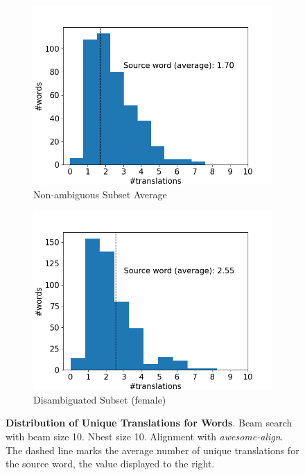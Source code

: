 \begin{figure}[!htb]
\begin{subfigure}{0.49\textwidth}
         \label{fig:alignment_translation_male}
     \end{subfigure}
     \begin{subfigure}{0.49\textwidth}
         \centering
         \includegraphics[width=\textwidth]{figures/alignment/align_10/word_translations_average.png}
         \caption{Non-ambiguous Subset Average}
         \label{fig:alignment_translation_common}
     \end{subfigure}
     \hfill
     \begin{subfigure}{0.49\textwidth}
         \centering
         \includegraphics[width=\textwidth]{figures/alignment/align_10/word_translations_female.png}
         \caption{Disambiguated Subset (female)}
         \label{fig:alignment_translation_female}
     \end{subfigure}
        \caption[Distribution of Unique Translations for Words]{\textbf{Distribution of Unique Translations for Words}. Beam search with beam size 10. Nbest size 10. Alignment with \textit{awesome-align}. The dashed line marks the average number of unique translations for the source word, the value displayed to the right.}
        \label{fig:alignment_graphs_translation_10}

\end{figure}

